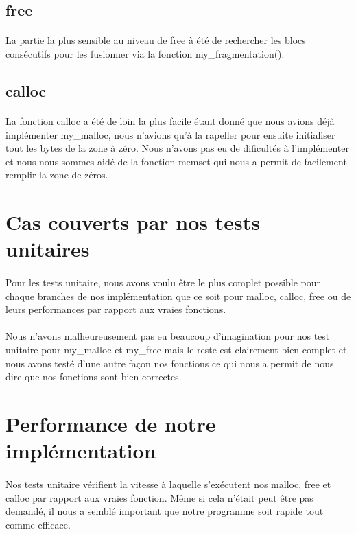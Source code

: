 \documentclass[10pt,a4paper]{article}
\begin{document}
\subsection{free}

\paragraph{}La partie la plus sensible au niveau de free à été de rechercher les blocs consécutifs pour les fusionner via la fonction my\_fragmentation().


\subsection{calloc}

\paragraph{}La fonction calloc a été de loin la plus facile étant donné que nous avions déjà implémenter my\_malloc, nous n'avions qu'à la rapeller pour ensuite initialiser tout les bytes de la zone à zéro. Nous n'avons pas eu de dificultés à l'implémenter et nous nous sommes aidé de la fonction memset qui nous a permit de facilement remplir la zone de zéros.


\section{Cas couverts par nos tests unitaires}

\paragraph{}Pour les tests unitaire, nous avons voulu être le plus complet possible pour chaque branches de nos implémentation que ce soit pour malloc, calloc, free ou de leurs performances par rapport aux vraies fonctions.

\paragraph{}Nous n'avons malheureusement pas eu beaucoup d'imagination pour nos test unitaire pour my\_malloc et my\_free mais le reste est clairement bien complet et nous avons testé d'une autre façon nos fonctions ce qui nous a permit de nous dire que nos fonctions sont bien correctes.


\section{Performance de notre implémentation}

\paragraph{}Nos tests unitaire vérifient la vitesse à laquelle s'exécutent nos malloc, free et calloc par rapport aux vraies fonction. Même si cela n'était peut être pas demandé, il nous a semblé important que notre programme soit rapide tout comme efficace.
\end{document}
